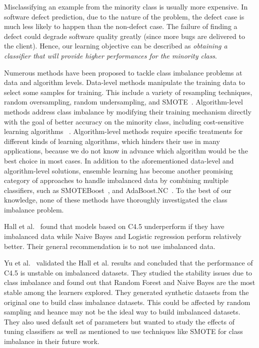 \documentclass[sigconf,review, anonymous]{acmart}
\theoremstyle{break}
\theoremstyle{break}
\begin{document}
Misclassifying an example from the minority class is usually more expensive. In software defect prediction, due to the nature of the problem, the defect case is much less likely to happen than the non-defect case.  The failure of finding a defect could degrade software quality greatly (since more bugs
are delivered to the client). Hence,
our learning objective can be described
as \textit{obtaining a classifier that will provide higher performances for the minority class}.

Numerous methods have been proposed to tackle class
imbalance problems at data and algorithm levels. Data-level methods manipulate the training data to select some samples for training. This
include a variety of resampling techniques, random oversampling, random undersampling, and SMOTE~\cite{estabrooks2004multiple}. Algorithm-level methods address class imbalance by modifying their training mechanism directly with the 
goal of better accuracy on the minority class, including cost-sensitive learning algorithms ~\cite{he2009learning}.
Algorithm-level methods require specific treatments for different
kinds of learning algorithms, which hinders their use
in many applications, because we do not know in advance
which algorithm would be the best choice in most cases. In addition to the aforementioned data-level and algorithm-level solutions, ensemble learning has become another promising category of approaches to handle imbalanced data by combining multiple classifiers, such as SMOTEBoost~\cite{chawla2003smoteboost}, and
AdaBoost.NC~\cite{wang2010negative}. To 
the best of our knowledge, none of these methods have  thoroughly investigated the class imbalance problem.

Hall et al.~\cite{hall2012systematic} found that models based on C4.5 underperform if they have imbalanced data while Naive Bayes and Logistic regression perform relatively better. 
Their general recommendation is to not use
imbalanced data.  

Yu et al.~\cite{yuperformance} validated the Hall et al. results and concluded that the
performance of C4.5 is unstable on imbalanced datasets. They studied the stability issues due to  class imbalance and found out that Random Forest and Naive Bayes are the most stable among the learners explored. They generated synthetic datasets from the original one to build class imbalance datasets. This could be affected by random sampling and heance may not be the ideal way to build imbalanced datasets. They also used default set of parameters but wanted to study the effects of tuning classifiers as well as mentioned to use techniques like SMOTE for class imbalance in their future work.
\end{document}
